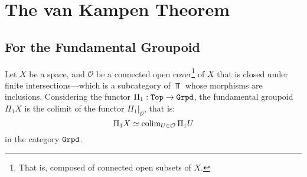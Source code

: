 \section{The van Kampen Theorem}

\subsection{For the Fundamental Groupoid}

\begin{theorem}
\label{thm:van-Kampen-groupoid}
Let \(X\) be a space, and \(\mathcal{O}\) be a connected open
cover\footnote{That is, composed of connected open subsets of \(X\).} of \(X\)
that is closed under finite intersections---which is a subcategory of \(\Top\)
whose morphisms are inclusions. Considering the functor
\(\Pi_1: {\texttt{Top}} \to {\texttt{Grpd}}\), the fundamental groupoid \(\Pi_1 X\) is the colimit
of the functor \(\Pi_1|_{\mathcal{O}}\), that is:
\[
\Pi_1 X \simeq \operatorname{colim}_{U \in \mathcal{O}} \Pi_1 U
\]
in the category \({\texttt{Grpd}}\).
\end{theorem}

